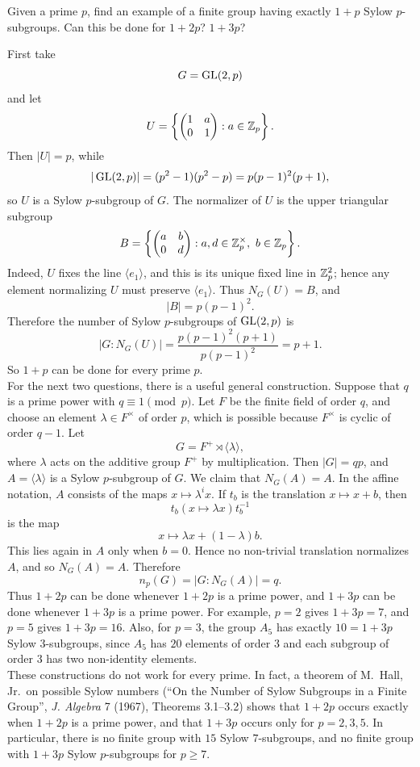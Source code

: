 \documentclass[../Odyssey_Project.tex]{subfiles}
\begin{document}
\begin{exercise}
\label{ex:7.6}
Given a prime $p$, find an example of a finite group having exactly $1 + p$ Sylow $p$-subgroups. Can this be done for $1 + 2p$? $1 + 3p$?
\end{exercise}
\begin{solution}
First take
\[
    G=\operatorname{GL}(2,p)
\]
and let
\[
    U=\left\{
    \begin{pmatrix}
        1 & a\\
        0 & 1
    \end{pmatrix}
    :a\in\mathbb{Z}_p
    \right\}.
\]
Then $|U|=p$, while
\[
    |\operatorname{GL}(2,p)|=(p^2-1)(p^2-p)=p(p-1)^2(p+1),
\]
so $U$ is a Sylow $p$-subgroup of $G$. The normalizer of $U$ is the upper triangular subgroup
\[
    B=\left\{
    \begin{pmatrix}
        a & b\\
        0 & d
    \end{pmatrix}
    :a,d\in\mathbb{Z}_p^\times,\ b\in\mathbb{Z}_p
    \right\}.
\]
Indeed, $U$ fixes the line $\langle e_1\rangle$, and this is its unique fixed line in $\mathbb{Z}_p^2$; hence any element normalizing $U$ must preserve $\langle e_1\rangle$. Thus $N_G(U)=B$, and
\[
    |B|=p(p-1)^2.
\]
Therefore the number of Sylow $p$-subgroups of $\operatorname{GL}(2,p)$ is
\[
    |G:N_G(U)|=\frac{p(p-1)^2(p+1)}{p(p-1)^2}=p+1.
\]
So $1+p$ can be done for every prime $p$.\\
For the next two questions, there is a useful general construction. Suppose that $q$ is a prime power with $q\equiv 1\pmod p$. Let $F$ be the finite field of order $q$, and choose an element $\lambda\in F^\times$ of order $p$, which is possible because $F^\times$ is cyclic of order $q-1$. Let
\[
    G=F^+\rtimes \langle \lambda\rangle,
\]
where $\lambda$ acts on the additive group $F^+$ by multiplication. Then $|G|=qp$, and $A=\langle\lambda\rangle$ is a Sylow $p$-subgroup of $G$. We claim that $N_G(A)=A$. In the affine notation, $A$ consists of the maps $x\mapsto \lambda^i x$. If $t_b$ is the translation $x\mapsto x+b$, then
\[
    t_b(x\mapsto \lambda x)t_b^{-1}
\]
is the map
\[
    x\mapsto \lambda x+(1-\lambda)b.
\]
This lies again in $A$ only when $b=0$. Hence no non-trivial translation normalizes $A$, and so $N_G(A)=A$. Therefore
\[
    n_p(G)=|G:N_G(A)|=q.
\]
Thus $1+2p$ can be done whenever $1+2p$ is a prime power, and $1+3p$ can be done whenever $1+3p$ is a prime power. For example, $p=2$ gives $1+3p=7$, and $p=5$ gives $1+3p=16$. Also, for $p=3$, the group $A_5$ has exactly $10=1+3p$ Sylow $3$-subgroups, since $A_5$ has $20$ elements of order $3$ and each subgroup of order $3$ has two non-identity elements.\\
These constructions do not work for every prime. In fact, a theorem of M.~Hall, Jr.\ on possible Sylow numbers (``On the Number of Sylow Subgroups in a Finite Group'', \emph{J. Algebra} 7 (1967), Theorems 3.1--3.2) shows that $1+2p$ occurs exactly when $1+2p$ is a prime power, and that $1+3p$ occurs only for $p=2,3,5$. In particular, there is no finite group with $15$ Sylow $7$-subgroups, and no finite group with $1+3p$ Sylow $p$-subgroups for $p\geq 7$.
\end{solution}
\end{document}
